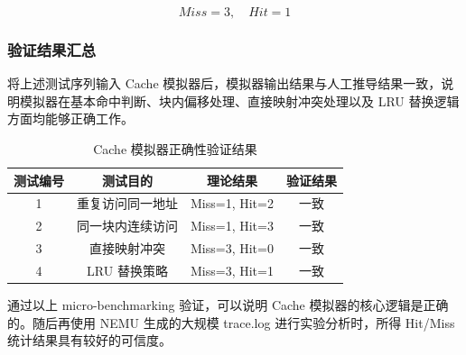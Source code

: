 \[
Miss = 3,\quad Hit = 1
\]

\subsubsection{验证结果汇总}

将上述测试序列输入 Cache 模拟器后，模拟器输出结果与人工推导结果一致，说明模拟器在基本命中判断、块内偏移处理、直接映射冲突处理以及 LRU 替换逻辑方面均能够正确工作。

\begin{table}[H]
\centering
\caption{Cache 模拟器正确性验证结果}
\begin{tabular}{c|c|c|c}
\hline
测试编号 & 测试目的 & 理论结果 & 验证结果 \\
\hline
1 & 重复访问同一地址 & Miss=1, Hit=2 & 一致 \\
2 & 同一块内连续访问 & Miss=1, Hit=3 & 一致 \\
3 & 直接映射冲突 & Miss=3, Hit=0 & 一致 \\
4 & LRU 替换策略 & Miss=3, Hit=1 & 一致 \\
\hline
\end{tabular}
\end{table}

通过以上 micro-benchmarking 验证，可以说明 Cache 模拟器的核心逻辑是正确的。随后再使用 NEMU 生成的大规模 trace.log 进行实验分析时，所得 Hit/Miss 统计结果具有较好的可信度。